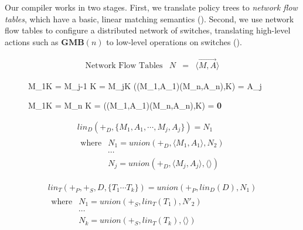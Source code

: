 Our compiler works in two stages. First, we translate policy trees to
\emph{network flow tables}, which have a basic,
linear matching semantics (). Second, we use
network flow tables to configure a distributed network of switches,
translating high-level actions such as $\textbf{GMB}(n)$ to low-level
operations on switches ().

\begin{figure}[t]

\begin{displaymath}
\begin{array}{lrcl}
\textrm{Network Flow Tables} & N & = & \langle \overrightarrow{M,A} \rangle
\end{array}
\end{displaymath}


\medskip

\inference
{M_1\cap K = \emptyset \cdots M_{j-1} \cap K = \emptyset \qquad
 M_j\cap K \ne \emptyset }
{(\langle(M_1,A_1)\cdots(M_n,A_n)\rangle,K) = A_j}

\medskip

\inference
{M_1\cap K = \emptyset \cdots M_{n} \cap K = \emptyset}
{(\langle(M_1,A_1)\cdots(M_n,A_n)\rangle,K) = \textbf{0}}

\medskip

\begin{displaymath}
\begin{array}{l}
\mathit{lin}_D\left(+_D,\{M_1,A_1, \cdots, M_j,A_j \}\right) 
  = N_1 \\
\begin{array}{lllll}
\textrm{where} 
& N_1 = \mathit{union}(+_D,\langle M_1,A_1\rangle, N_2) \\
& \cdots \\
& N_j = \mathit{union}(+_D, \langle M_j,A_j\rangle, \langle\rangle)
\end{array}
\end{array}
\end{displaymath}

\begin{displaymath}
\begin{array}{l}
\mathit{lin}_T\left(+_P,+_S,D, \{T_1\cdots T_k\}\right)
  = \mathit{union}(+_P,\mathit{lin}_D(D), N_1) \\
\begin{array}{lllll}
\textrm{where} 
& N_1 = \mathit{union}(+_S, \mathit{lin}_T(T_1), N'_2) \\
& \cdots \\
& N_k = \mathit{union}(+_S,\mathit{lin}_T(T_k), \langle \rangle)
\end{array}
\end{array}
\end{displaymath}


\end{figure}
